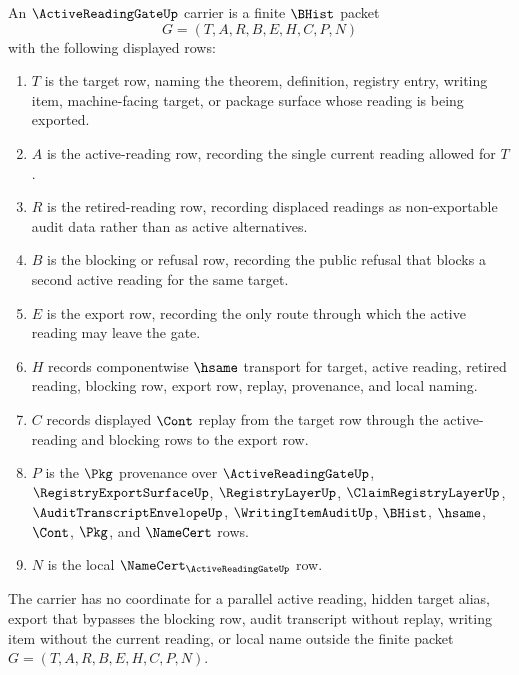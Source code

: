 \begin{definition}
\label{def:active-reading-gate-carrier}
An $\ActiveReadingGateUp$ carrier is a finite $\BHist$ packet
$$
G=(T,A,R,B,E,H,C,P,N)
$$
with the following displayed rows:
\begin{enumerate}
\item $T$ is the target row, naming the theorem, definition, registry entry, writing item, machine-facing target, or package surface whose reading is being exported.
\item $A$ is the active-reading row, recording the single current reading allowed for $T$.
\item $R$ is the retired-reading row, recording displaced readings as non-exportable audit data rather than as active alternatives.
\item $B$ is the blocking or refusal row, recording the public refusal that blocks a second active reading for the same target.
\item $E$ is the export row, recording the only route through which the active reading may leave the gate.
\item $H$ records componentwise $\hsame$ transport for target, active reading, retired reading, blocking row, export row, replay, provenance, and local naming.
\item $C$ records displayed $\Cont$ replay from the target row through the active-reading and blocking rows to the export row.
\item $P$ is the $\Pkg$ provenance over $\ActiveReadingGateUp$, $\RegistryExportSurfaceUp$, $\RegistryLayerUp$, $\ClaimRegistryLayerUp$, $\AuditTranscriptEnvelopeUp$, $\WritingItemAuditUp$, $\BHist$, $\hsame$, $\Cont$, $\Pkg$, and $\NameCert$ rows.
\item $N$ is the local $\NameCert_{\ActiveReadingGateUp}$ row.
\end{enumerate}
The carrier has no coordinate for a parallel active reading, hidden target alias, export that bypasses the blocking row, audit transcript without replay, writing item without the current reading, or local name outside the finite packet $G=(T,A,R,B,E,H,C,P,N)$.
\end{definition}

